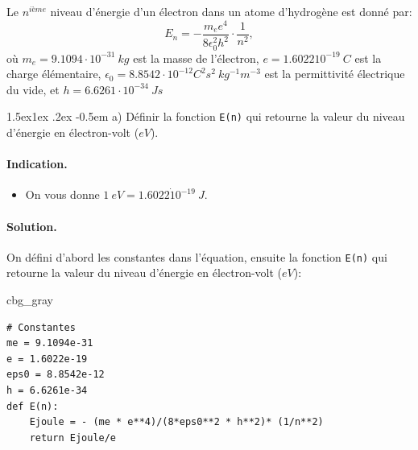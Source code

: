\documentclass[%
oneside,                 %
final,                   %
10pt,french]{article}
\makeatletter
\newenvironment{_cod_tight}[1]{
   \def\FrameCommand{\colorbox{#1}}
   \FrameRule0.6pt\MakeFramed {\FrameRestore}\vskip3mm}
   {\vskip0mm\endMakeFramed}
\newenvironment{cod}[1]{
\bgroup\rmfamily
\fboxsep=0mm\relax
\begin{_cod_tight}{#1}
\list{}{\parsep=-2mm\parskip=0mm\topsep=0pt\leftmargin=2mm
\rightmargin=2\leftmargin\leftmargin=4pt\relax}
\item\relax}
{\endlist\end{_cod_tight}\egroup}
\newenvironment{doconceexercise}{}{}
\newcounter{doconceexercisecounter}
\newcommand\subex{\@startsection{paragraph}{4}{\z@}%
                  {1.5ex\@plus1ex \@minus.2ex}%
                  {-0.5em}%
                  {\normalfont\normalsize\bfseries}}
\makeatother
\begin{document}
\begin{doconceexercise}



Le $n^{ième}$ niveau d'énergie d'un électron dans un atome d'hydrogène est donné par:
\begin{equation}
E_n = -\frac{m_e e^4}{8\epsilon_0^2h^2}\cdot\frac{1}{n^2} ,
\end{equation}
où $m_e = 9.1094⋅10^{-31} \ kg$ est la masse de l'électron, $e = 1.602210^{−19} \ C$ est la charge élémentaire, $\epsilon_0 = 8.8542 \cdot 10^{-12} C^2 s^2 \ kg^{-1}m^{-3}$ est la permittivité électrique du vide, et $h=6.6261 \cdot 10^{−34} \ Js$


\subex{a)}
Définir la fonction \texttt{E(n)} qui retourne la valeur du niveau d’énergie en électron-volt ($eV$).


\paragraph{Indication.}
\begin{itemize}
\item On vous donne $1 \ eV = 1.6022 \dot 10^{-19} \ J$.
\end{itemize}

\noindent


\paragraph{Solution.}
On défini d'abord les constantes dans l'équation, ensuite la fonction \texttt{E(n)} qui retourne la valeur du niveau d’énergie en électron-volt ($eV$):
\begin{cod}{cbg_gray}\begin{verbatim}
# Constantes
me = 9.1094e-31
e = 1.6022e-19
eps0 = 8.8542e-12
h = 6.6261e-34
def E(n):
    Ejoule = - (me * e**4)/(8*eps0**2 * h**2)* (1/n**2)
    return Ejoule/e
\end{verbatim}
\end{cod}
\noindent



\end{doconceexercise}
\end{document}
